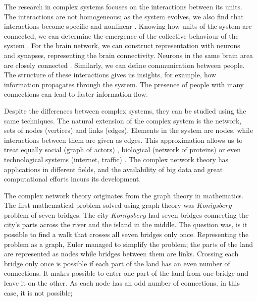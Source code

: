 The research in complex systems focuses on the interactions between its units. The interactions are not homogeneous; as the system evolves, we also find that interactions become specific and nonlinear \cite{thurner2018}. Knowing how units of the system are connected, we can determine the emergence of the collective behaviour of the system \cite{ladyman2013}. For the brain network, we can construct representation with neurons and synapses, representing the brain connectivity. Neurons in the same brain area are closely connected \cite{latora2017complex}.
Similarly, we can define communication between people. The structure of these interactions gives us insights, for example, how information propagates through the system. The presence of people with many connections can lead to faster information flow. 

Despite the differences between complex systems, they can be studied using the same techniques. The natural extension of the complex system is the network, sets of nodes (vertices) and links (edges). Elements in the system are nodes, while interactions between them are given as edges. This approximation allows us to treat equally social \cite{myers2014, sarigol2014} (graph of actors) , biological (network of proteins) \cite{fraiman2009ising, schneider2011modeling} or even technological systems (internet, traffic) \cite{costa2007characterization, costa2011analyzing, newman2003structure}. The complex network theory has applications in different fields, and the availability of big data and great computational efforts incurs its development. 

The complex network theory originates from the graph theory in mathematics. 
The first mathematical problem solved using graph theory was $Konigsberg$ problem of seven bridges. The city $Konigsberg$ had seven bridges connecting the city's parts across the river and the island in the middle. The question was, is it possible to find a walk that crosses all seven bridges only once. Representing the problem as a graph, Euler managed to simplify the problem; the parts of the land are represented as nodes while bridges between them are links. Crossing each bridge only once is possible if each part of the land has an even number of connections. It makes possible to enter one part of the land from one bridge and leave it on the other. As each node has an odd number of connections, in this case, it is not possible; %


